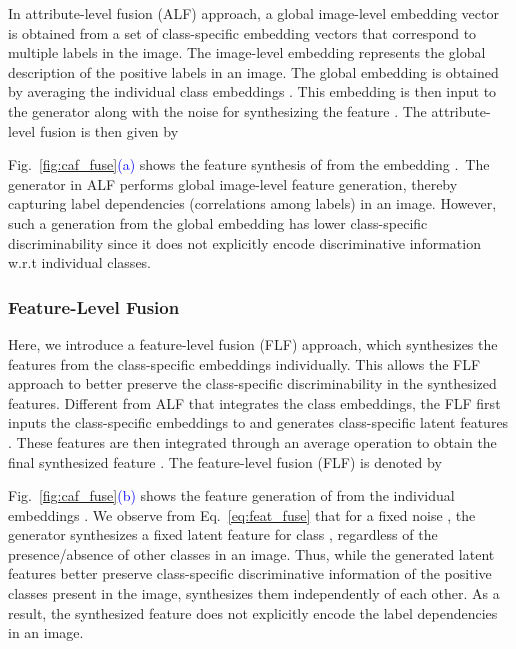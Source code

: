 \documentclass[10pt,journal,compsoc]{IEEEtran}
\newcommand{\highlight}[1]{\textcolor{blue}{#1}}
\begin{document}
In attribute-level fusion (ALF) approach, a global image-level embedding vector is obtained from a set of class-specific embedding vectors that correspond to multiple labels in the image. The image-level embedding represents the global description of the positive labels in an image.  The global embedding 
 is obtained by averaging the individual class embeddings . This embedding  is then input to the generator  along with the noise  for synthesizing the feature . The attribute-level fusion is then given by

Fig.~\ref{fig:caf_fuse}\highlight{(a)} shows the feature synthesis of  from the embedding .~The generator  in ALF performs global image-level feature generation, thereby capturing label dependencies (correlations among labels) in an image. However, such a generation from the global embedding has lower class-specific discriminability since it does not explicitly encode discriminative information w.r.t individual classes. 


















\subsubsection{Feature-Level Fusion}\label{sec:feat_fuse}
Here, we introduce a feature-level fusion (FLF) approach,
which synthesizes the features from the class-specific embeddings individually. This allows the FLF approach to better preserve the class-specific discriminability in the synthesized features.
Different from ALF that integrates the class embeddings, the FLF first inputs the  class-specific embeddings  to  and generates  class-specific latent features . These features are then integrated through an average operation to obtain the final synthesized feature . The feature-level fusion (FLF) is denoted by

Fig.~\ref{fig:caf_fuse}\highlight{(b)} shows the feature generation of  from the individual embeddings . We observe from Eq.~\ref{eq:feat_fuse} that for a fixed noise , the generator  synthesizes a fixed latent feature  for class , regardless of the presence/absence of other classes in an image.
Thus, while the generated latent features  better preserve class-specific discriminative information of the positive classes  present in the image,   synthesizes them independently of each other.
As a result, the synthesized feature  does not explicitly encode the label dependencies in an image. 
\end{document}
